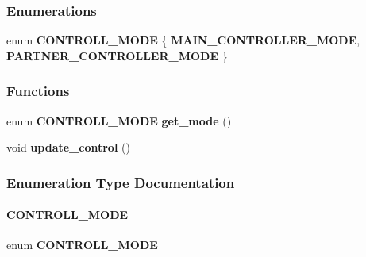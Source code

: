 \subsubsection*{Enumerations}
\begin{DoxyCompactItemize}
\item 
enum \textbf{ C\+O\+N\+T\+R\+O\+L\+L\+\_\+\+M\+O\+DE} \{ \textbf{ M\+A\+I\+N\+\_\+\+C\+O\+N\+T\+R\+O\+L\+L\+E\+R\+\_\+\+M\+O\+DE}, 
\textbf{ P\+A\+R\+T\+N\+E\+R\+\_\+\+C\+O\+N\+T\+R\+O\+L\+L\+E\+R\+\_\+\+M\+O\+DE}
 \}
\end{DoxyCompactItemize}
\subsubsection*{Functions}
\begin{DoxyCompactItemize}
\item 
enum \textbf{ C\+O\+N\+T\+R\+O\+L\+L\+\_\+\+M\+O\+DE} \textbf{ get\+\_\+mode} ()
\item 
void \textbf{ update\+\_\+control} ()
\end{DoxyCompactItemize}


\subsubsection{Enumeration Type Documentation}
\mbox{\label{partner_8h_afb2b5bca5ceab5f6efd8bac14a568324}} 
\paragraph{C\+O\+N\+T\+R\+O\+L\+L\+\_\+\+M\+O\+DE}
{\footnotesize\ttfamily enum \textbf{ C\+O\+N\+T\+R\+O\+L\+L\+\_\+\+M\+O\+DE}}

